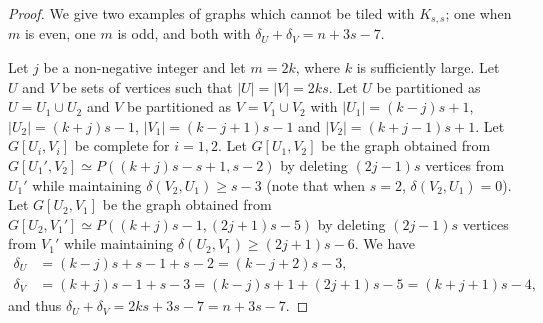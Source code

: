 \documentclass[oneside,12pt]{memoir}
\begin{document}
\begin{proof}
 
% 
% 
% 

We give two examples of graphs which cannot be tiled with $K_{s,s}$; one when $m$ is even, one $m$ is odd, and both with $\delta_U+\delta_V=n+3s-7$.  

Let $j$ be a non-negative integer and let $m=2k$, where $k$ is sufficiently large.  Let $U$ and $V$ be sets of vertices such that $|U|=|V|=2ks$.  Let $U$ be partitioned as $U=U_1\cup U_2$ and $V$ be partitioned as $V=V_1\cup V_2$ with $|U_1|=(k-j)s+1$, $|U_2|=(k+j)s-1$, $|V_1|=(k-j+1)s-1$ and $|V_2|=(k+j-1)s+1$.  Let $G[U_i, V_i]$ be complete for $i=1,2$.  Let $G[U_1, V_2]$ be the graph obtained from $G[U_1', V_2]\simeq P((k+j)s-s+1, s-2)$ by deleting $(2j-1)s$ vertices from $U_1'$ while maintaining $\delta(V_2, U_1)\geq s-3$ (note that when $s=2$, $\delta(V_2, U_1)=0$).  Let $G[U_2, V_1]$ be the graph obtained from $G[U_2, V_1']\simeq P((k+j)s-1, (2j+1)s-5)$ by deleting $(2j-1)s$ vertices from $V_1'$ while maintaining $\delta(U_2, V_1)\geq (2j+1)s-6$.
We have 
\begin{align*}
\delta_U&=(k-j)s+s-1+s-2=(k-j+2)s-3,\\
\delta_V&=(k+j)s-1+s-3=(k-j)s+1+(2j+1)s-5=(k+j+1)s-4,
\end{align*}
and thus $\delta_U+\delta_V= 2ks+3s-7= n+3s-7.$




\end{proof}
\end{document}
